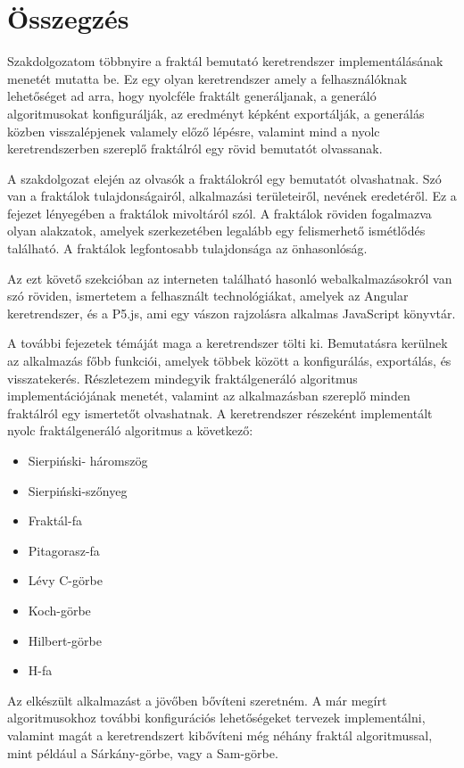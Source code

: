 \chapter*{Összegzés}
Szakdolgozatom többnyire a fraktál bemutató keretrendszer implementálásának menetét mutatta be. Ez egy olyan keretrendszer amely a felhasználóknak lehetőséget ad arra, hogy nyolcféle fraktált generáljanak, a generáló algoritmusokat konfigurálják, az eredményt képként exportálják, a generálás közben visszalépjenek valamely előző lépésre, valamint mind a nyolc keretrendszerben szereplő fraktálról egy rövid bemutatót olvassanak.
\par A szakdolgozat elején az olvasók a fraktálokról egy bemutatót olvashatnak. Szó van a fraktálok tulajdonságairól, alkalmazási területeiről, nevének eredetéről. Ez a fejezet lényegében a fraktálok mivoltáról szól. A fraktálok röviden fogalmazva olyan alakzatok, amelyek szerkezetében legalább egy felismerhető ismétlődés található. A fraktálok legfontosabb tulajdonsága az önhasonlóság.
\par Az ezt követő szekcióban az interneten található hasonló webalkalmazásokról van szó röviden, ismertetem a felhasznált technológiákat, amelyek az Angular keretrendszer, és a P5.js, ami egy vászon rajzolásra alkalmas JavaScript könyvtár. 
\par A további fejezetek témáját maga a keretrendszer tölti ki. Bemutatásra kerülnek az alkalmazás főbb funkciói, amelyek többek között a konfigurálás, exportálás, és visszatekerés. Részletezem mindegyik fraktálgeneráló algoritmus implementációjának menetét, valamint az alkalmazásban szereplő minden fraktálról egy ismertetőt olvashatnak. A keretrendszer részeként implementált nyolc fraktálgeneráló algoritmus a következő: 
\begin{itemize}
	\item Sierpiński- háromszög
	\item Sierpiński-szőnyeg
	\item Fraktál-fa
	\item Pitagorasz-fa
	\item Lévy C-görbe
	\item Koch-görbe
	\item Hilbert-görbe
	\item H-fa
\end{itemize}
\par Az elkészült alkalmazást a jövőben bővíteni szeretném. A már megírt algoritmusokhoz további konfigurációs lehetőségeket tervezek implementálni, valamint magát a keretrendszert kibővíteni még néhány fraktál algoritmussal, mint például a Sárkány-görbe, vagy a Sam-görbe.